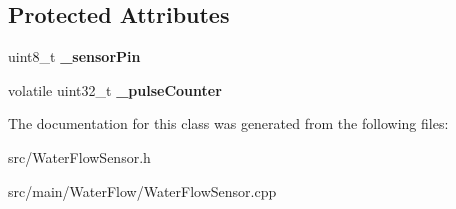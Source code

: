 \subsection*{Protected Attributes}
\begin{DoxyCompactItemize}
\item 
\mbox{\label{class_easyuino_1_1_water_flow_sensor_a7efef15ef9da3a66bd40183c4ea908ff}} 
uint8\+\_\+t {\bfseries \+\_\+sensor\+Pin}
\item 
\mbox{\label{class_easyuino_1_1_water_flow_sensor_a8877c5e4a3ed8012341d416ce05fa93e}} 
volatile uint32\+\_\+t {\bfseries \+\_\+pulse\+Counter}
\end{DoxyCompactItemize}


The documentation for this class was generated from the following files\+:\begin{DoxyCompactItemize}
\item 
src/Water\+Flow\+Sensor.\+h\item 
src/main/\+Water\+Flow/Water\+Flow\+Sensor.\+cpp\end{DoxyCompactItemize}
